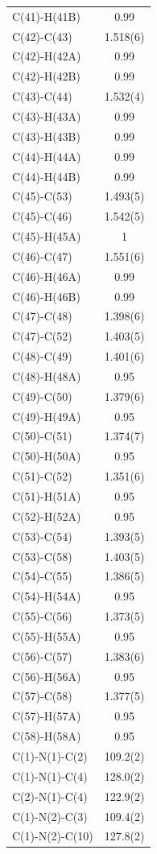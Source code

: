\begin{center}
{\begin{supertabular}{p{1.5in}c}
C(41)-H(41B) &0.99\\
C(42)-C(43) &1.518(6)\\
C(42)-H(42A) &0.99\\
C(42)-H(42B) &0.99\\
C(43)-C(44) &1.532(4)\\
C(43)-H(43A) &0.99\\
C(43)-H(43B) &0.99\\
C(44)-H(44A) &0.99\\
C(44)-H(44B) &0.99\\
C(45)-C(53) &1.493(5)\\
C(45)-C(46) &1.542(5)\\
C(45)-H(45A) &1\\
C(46)-C(47) &1.551(6)\\
C(46)-H(46A) &0.99\\
C(46)-H(46B) &0.99\\
C(47)-C(48) &1.398(6)\\
C(47)-C(52) &1.403(5)\\
C(48)-C(49) &1.401(6)\\
C(48)-H(48A) &0.95\\
C(49)-C(50) &1.379(6)\\
C(49)-H(49A) &0.95\\
C(50)-C(51) &1.374(7)\\
C(50)-H(50A) &0.95\\
C(51)-C(52) &1.351(6)\\
C(51)-H(51A) &0.95\\
C(52)-H(52A) &0.95\\
C(53)-C(54) &1.393(5)\\
C(53)-C(58) &1.403(5)\\
C(54)-C(55) &1.386(5)\\
C(54)-H(54A) &0.95\\
C(55)-C(56) &1.373(5)\\
C(55)-H(55A) &0.95\\
C(56)-C(57) &1.383(6)\\
C(56)-H(56A) &0.95\\
C(57)-C(58) &1.377(5)\\
C(57)-H(57A) &0.95\\
C(58)-H(58A) &0.95\\
C(1)-N(1)-C(2)&109.2(2)\\
C(1)-N(1)-C(4)&128.0(2)\\
C(2)-N(1)-C(4)&122.9(2)\\
C(1)-N(2)-C(3)&109.4(2)\\
C(1)-N(2)-C(10)&127.8(2)\\

\end{supertabular}}
\end{center}
